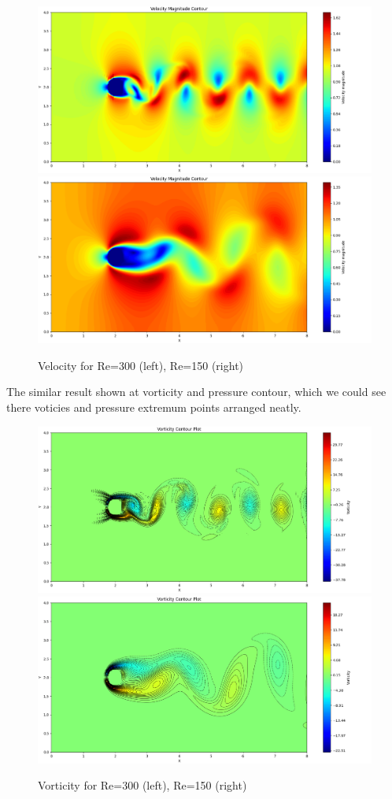 \documentclass[12pt]{article}
\begin{document}
\begin{figure}[H]
    \centering
    \includegraphics[width=0.45\linewidth]{figure/N32_Re1000_8x4_t100/v_N32_Re1000_8x4_t100.jpg}
    \includegraphics[width=0.45\linewidth]{figure/N32_Re150_8x4_t100/v_N32_Re150_8x4_t100.jpg}
    \caption{Velocity for Re=300 (left), Re=150 (right) }
\end{figure}


The similar result shown at vorticity and pressure contour, which we could see there voticies and pressure extremum points arranged neatly.




\begin{figure}[H]
    \centering
    \includegraphics[width=0.45\linewidth]{figure/N32_Re1000_8x4_t100/vor_N32_Re1000_8x4_t100.jpg}
    \includegraphics[width=0.45\linewidth]{figure/N32_Re150_8x4_t100/vor_N32_Re150_8x4_t100.jpg}
    \caption{Vorticity for Re=300 (left), Re=150 (right) }
\end{figure}
\end{document}
